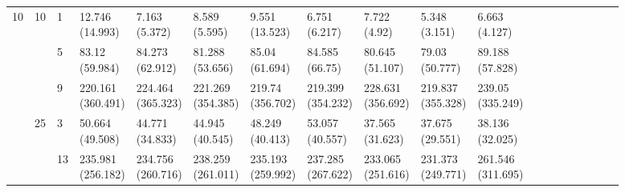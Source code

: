 \documentclass[12pt,a4paper]{article}
\begin{document}
\begin{landscape}
\begin{longtable}{lllllllllllrrrrrrrr}
\midrule
\multirow[t]{9}{*}{10} & \multirow[t]{3}{*}{10} & 1 & \makecell{12.746 \\ (14.993)} & \makecell{7.163 \\ (5.372)} & \makecell{8.589 \\ (5.595)} & \makecell{9.551 \\ (13.523)} & \makecell{6.751 \\ (6.217)} & \makecell{7.722 \\ (4.92)} & \makecell{5.348 \\ (3.151)} & \makecell{6.663 \\ (4.127)} \\
 &  & 5 & \makecell{83.12 \\ (59.984)} & \makecell{84.273 \\ (62.912)} & \makecell{81.288 \\ (53.656)} & \makecell{85.04 \\ (61.694)} & \makecell{84.585 \\ (66.75)} & \makecell{80.645 \\ (51.107)} & \makecell{79.03 \\ (50.777)} & \makecell{89.188 \\ (57.828)} \\
 &  & 9 & \makecell{220.161 \\ (360.491)} & \makecell{224.464 \\ (365.323)} & \makecell{221.269 \\ (354.385)} & \makecell{219.74 \\ (356.702)} & \makecell{219.399 \\ (354.232)} & \makecell{228.631 \\ (356.692)} & \makecell{219.837 \\ (355.328)} & \makecell{239.05 \\ (335.249)} \\
\cline{2-11}
 & \multirow[t]{3}{*}{25} & 3 & \makecell{50.664 \\ (49.508)} & \makecell{44.771 \\ (34.833)} & \makecell{44.945 \\ (40.545)} & \makecell{48.249 \\ (40.413)} & \makecell{53.057 \\ (40.557)} & \makecell{37.565 \\ (31.623)} & \makecell{37.675 \\ (29.551)} & \makecell{38.136 \\ (32.025)} \\
 &  & 13 & \makecell{235.981 \\ (256.182)} & \makecell{234.756 \\ (260.716)} & \makecell{238.259 \\ (261.011)} & \makecell{235.193 \\ (259.992)} & \makecell{237.285 \\ (267.622)} & \makecell{233.065 \\ (251.616)} & \makecell{231.373 \\ (249.771)} & \makecell{261.546 \\ (311.695)} \\

\end{longtable}
\end{landscape}
\end{document}
